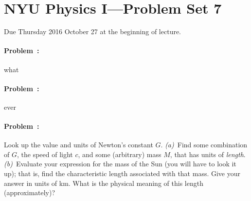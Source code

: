 \documentclass[12pt]{article}
\begin{document}
\section*{NYU Physics I---Problem Set 7}

Due Thursday 2016 October 27 at the beginning of lecture.

\paragraph{Problem~\theproblem:}%
what

\paragraph{Problem~\theproblem:}%
ever

\paragraph{Problem~\theproblem:}%
Look up the value and units of Newton's constant $G$.
\textsl{(a)}~Find some combination of $G$, the speed of light $c$, and
some (arbitrary) mass $M$, that has units of \emph{length}.
\textsl{(b)}~Evaluate your expression for the mass of the Sun (you
will have to look it up); that is, find the characteristic length
associated with that mass.  Give your answer in units of km.  What is
the physical meaning of this length (approximately)?
\end{document}

